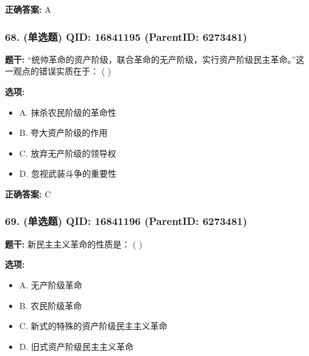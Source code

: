\documentclass[12pt,UTF8]{ctexart}
\begin{document}
\textbf{正确答案:}
A

\vspace{0.3em}\hrulefill\vspace{0.7em}

\subsubsection*{68. (单选题) \small QID: 16841195 (ParentID: 6273481)}

\textbf{题干:}
“统帅革命的资产阶级，联合革命的无产阶级，实行资产阶级民主革命。”这一观点的错误实质在于： ( )



\textbf{选项:}
\begin{itemize}[leftmargin=*]

  \item A. 抹杀农民阶级的革命性

  \item B. 夸大资产阶级的作用

  \item C. 放弃无产阶级的领导权

  \item D. 忽视武装斗争的重要性

\end{itemize}

\textbf{正确答案:}
C

\vspace{0.3em}\hrulefill\vspace{0.7em}

\subsubsection*{69. (单选题) \small QID: 16841196 (ParentID: 6273481)}

\textbf{题干:}
新民主主义革命的性质是： ( )



\textbf{选项:}
\begin{itemize}[leftmargin=*]

  \item A. 无产阶级革命

  \item B. 农民阶级革命

  \item C. 新式的特殊的资产阶级民主主义革命

  \item D. 旧式资产阶级民主主义革命

\end{itemize}
\end{document}
